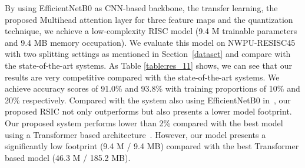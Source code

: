 \documentclass[sigconf]{acmart}
\begin{document}
By using EfficientNetB0 as CNN-based backbone, the transfer learning, the proposed Multihead attention layer for three feature maps and the quantization technique, we achieve a low-complexity RISC model (9.4 M trainable parameters and 9.4 MB memory occupation).
We evaluate this model on NWPU-RESISC45 with two splitting settings as mentioned in Section~\ref{dataset} and compare with the state-of-the-art systems.
As Table \ref{table:res_11} shows, we can see that our results are very competitive compared with the state-of-the-art systems.
We achieve accuracy scores of 91.0\% and 93.8\% with training proportions of 10\% and 20\% respectively.
Compared with the system also using EfficientNetB0 in~\cite{sota_05}, our proposed RSIC not only outperforms but also presents a lower model footprint.
Our proposed system performs lower than 2\% compared with the best model using a Transformer based architecture~\cite{sota_13}. 
However, our model presents a significantly low footprint (9.4 M / 9.4 MB) compared with the best Transformer based model (46.3 M / 185.2 MB).
\begin{table}[t]
    \caption{Performance (Acc.\%) of EfficientNetB0 with the proposed Multihead attention applied for feature maps extracted from different convolutional blocks on the benchmark NWPU-RESISC45 dataset using 20\%-80\% splitting settings.} 
    \centering
    \label{table:res03} 
\end{table}
\end{document}
